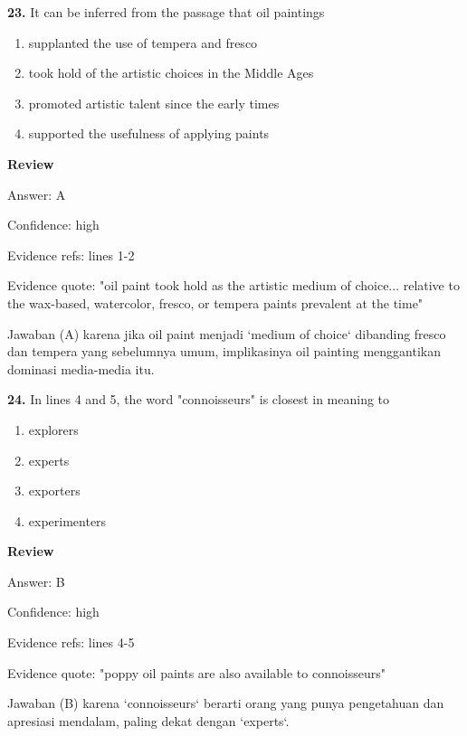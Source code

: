 \documentclass[12pt]{article}
\begin{document}
\endgroup
\par
\vspace{0.25\baselineskip}
\noindent\textbf{23.} It can be inferred from the passage that oil paintings
\begin{enumerate}[label=(\Alph*),leftmargin=*,itemsep=0.2em]
\item supplanted the use of tempera and fresco
\item took hold of the artistic choices in the Middle Ages
\item promoted artistic talent since the early times
\item supported the usefulness of applying paints
\end{enumerate}
\par
\begingroup
\setlength{\parskip}{0pt}
\setlength{\parindent}{0pt}
\textbf{Review}\par
Answer: A\par
Confidence: high\par
Evidence refs: lines 1-2\par
Evidence quote: "oil paint took hold as the artistic medium of choice... relative to the wax-based, watercolor, fresco, or tempera paints prevalent at the time"\par
Jawaban (A) karena jika oil paint menjadi `medium of choice` dibanding fresco dan tempera yang sebelumnya umum, implikasinya oil painting menggantikan dominasi media-media itu.\par
\endgroup
\par
\vspace{0.25\baselineskip}
\noindent\textbf{24.} In lines 4 and 5, the word "connoisseurs" is closest in meaning to
\begin{enumerate}[label=(\Alph*),leftmargin=*,itemsep=0.2em]
\item explorers
\item experts
\item exporters
\item experimenters
\end{enumerate}
\par
\begingroup
\setlength{\parskip}{0pt}
\setlength{\parindent}{0pt}
\textbf{Review}\par
Answer: B\par
Confidence: high\par
Evidence refs: lines 4-5\par
Evidence quote: "poppy oil paints are also available to connoisseurs"\par
Jawaban (B) karena `connoisseurs` berarti orang yang punya pengetahuan dan apresiasi mendalam, paling dekat dengan `experts`.\par
\end{document}

